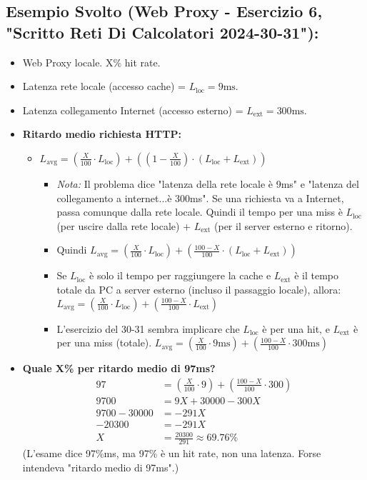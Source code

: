 \subsection{Esempio Svolto (Web Proxy - Esercizio 6, "Scritto Reti Di Calcolatori 2024-30-31"):}
\begin{itemize}
    \item Web Proxy locale. X\% hit rate.
    \item Latenza rete locale (accesso cache) = $L_{\text{loc}} = 9\text{ms}$.
    \item Latenza collegamento Internet (accesso esterno) = $L_{\text{ext}} = 300\text{ms}$.
    \item \textbf{Ritardo medio richiesta HTTP:}
        \begin{itemize}
            \item $L_{\text{avg}} = \left(\frac{X}{100} \cdot L_{\text{loc}}\right) + \left(\left(1 - \frac{X}{100}\right) \cdot (L_{\text{loc}} + L_{\text{ext}})\right)$
                \begin{itemize}
                    \item \textit{Nota:} Il problema dice "latenza della rete locale è 9ms" e "latenza del collegamento a internet...è 300ms". Se una richiesta va a Internet, passa comunque dalla rete locale. Quindi il tempo per una miss è $L_{\text{loc}}$ (per uscire dalla rete locale) + $L_{\text{ext}}$ (per il server esterno e ritorno).
                    \item Quindi $L_{\text{avg}} = \left(\frac{X}{100} \cdot L_{\text{loc}}\right) + \left(\frac{100-X}{100} \cdot (L_{\text{loc}} + L_{\text{ext}})\right)$
                    \item Se $L_{\text{loc}}$ è solo il tempo per raggiungere la cache e $L_{\text{ext}}$ è il tempo totale da PC a server esterno (incluso il passaggio locale), allora:
                    $L_{\text{avg}} = \left(\frac{X}{100} \cdot L_{\text{loc}}\right) + \left(\frac{100-X}{100} \cdot L_{\text{ext}}\right)$
                    \item L'esercizio del 30-31 sembra implicare che $L_{\text{loc}}$ è per una hit, e $L_{\text{ext}}$ è per una miss (totale).
                    $L_{\text{avg}} = \left(\frac{X}{100} \cdot 9\text{ms}\right) + \left(\frac{100-X}{100} \cdot 300\text{ms}\right)$
                \end{itemize}
        \end{itemize}
    \item \textbf{Quale X\% per ritardo medio di 97ms?}
        \begin{align*}
            97 &= \left(\frac{X}{100} \cdot 9\right) + \left(\frac{100-X}{100} \cdot 300\right) \\
            9700 &= 9X + 30000 - 300X \\
            9700 - 30000 &= -291X \\
            -20300 &= -291X \\
            X &= \frac{20300}{291} \approx 69.76\%
        \end{align*}
        (L'esame dice 97\%ms, ma 97\% è un hit rate, non una latenza. Forse intendeva "ritardo medio di 97ms".)
\end{itemize}

